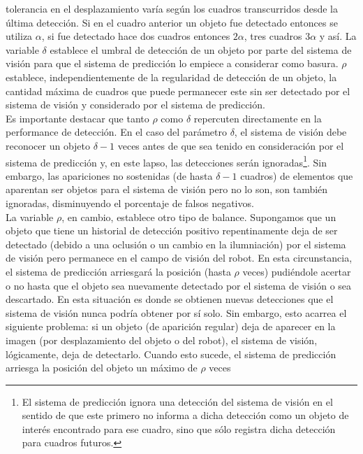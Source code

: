 tolerancia en el desplazamiento var\'ia seg\'un los cuadros transcurridos desde la \'ultima 
detecci\'on. Si en el cuadro anterior un objeto fue detectado entonces se utiliza 
$\alpha$, si fue detectado hace dos cuadros entonces $2\alpha$, tres 
cuadros $3\alpha$ y as\'i. La variable $\delta$ establece el umbral de 
detecci\'on de un objeto por parte del sistema de visi\'on para que el 
sistema de predicci\'on lo empiece  a considerar como basura. $\rho$ establece, 
independientemente de la  
regularidad de detecci\'on de un objeto, la cantidad m\'axima de cuadros que puede 
permanecer este sin ser detectado por el sistema de visi\'on y 
considerado por el sistema de predicci\'on. \\  	
\indent Es importante destacar que tanto $\rho$ como $\delta$ repercuten directamente en la 
performance de detecci\'on. En el caso del par\'ametro $\delta$, el 
sistema de visi\'on debe reconocer un objeto $\delta -1$ veces antes de que sea 
tenido en consideraci\'on por el sistema de predicci\'on y, en este lapso, las 
detecciones ser\'an ignoradas\footnote{El sistema de predicci\'on ignora 
una detecci\'on del sistema de visi\'on en el sentido de que este primero 
no informa a dicha detecci\'on como un objeto de inter\'es encontrado para 
ese cuadro, sino que s\'olo registra dicha detecci\'on para 
cuadros futuros.}. Sin embargo, las apariciones no sostenidas 
(de hasta $\delta -1$ cuadros) de elementos que aparentan ser objetos 
para el sistema de visi\'on pero no lo son, son tambi\'en ignoradas, 
disminuyendo el porcentaje de falsos negativos.\\
\indent La variable $\rho$, en cambio, establece otro tipo de balance. 
Supongamos que un objeto que tiene un historial de detecci\'on 
positivo repentinamente deja de ser detectado (debido a una oclusi\'on 
o un cambio en la ilumniaci\'on) por el sistema de visi\'on 
pero permanece en el campo de visi\'on del robot. En esta 
circunstancia, el sistema de predicci\'on 
arriesgar\'a la posici\'on (hasta $\rho$ veces) pudi\'endole acertar o no hasta que el objeto 
sea nuevamente detectado por el sistema de visi\'on o sea descartado.
En esta situaci\'on es donde se obtienen nuevas detecciones que el 
sistema de visi\'on nunca podr\'ia obtener por s\'i solo. Sin embargo, 
esto acarrea el siguiente problema: si un objeto (de aparici\'on regular) deja de aparecer en la imagen (por 
desplazamiento del objeto o del robot), el sistema de visi\'on, 
l\'ogicamente, deja de detectarlo. Cuando esto sucede, el sistema de 
predicci\'on arriesga la posici\'on del objeto un m\'aximo de $\rho$ veces 
